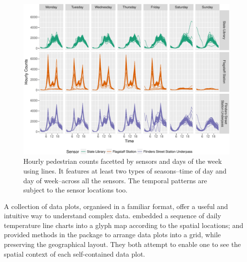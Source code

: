 \documentclass[article]{jss}
\begin{document}
\begin{CodeChunk}
\begin{figure}

{\centering \includegraphics[width=\textwidth]{figure/facet-time-1} 

}

\caption[Hourly pedestrian counts facetted by sensors and days of the week using lines]{Hourly pedestrian counts facetted by sensors and days of the week using lines. It features at least two types of seasons--time of day and day of week--across all the sensors. The temporal patterns are subject to the sensor locations too.}\label{fig:facet-time}
\end{figure}
\end{CodeChunk}

A collection of data plots, organised in a familiar format, offer a
useful and intuitive way to understand complex data.
\citet{Wickham2012glyph} embedded a sequence of daily temperature line
charts into a glyph map according to the spatial locations; and
\citet{R-geofacet} provided methods in the  package to
arrange data plots into a grid, while preserving the geographical
layout. They both attempt to enable one to see the spatial context of
each self-contained data plot.
\end{document}
